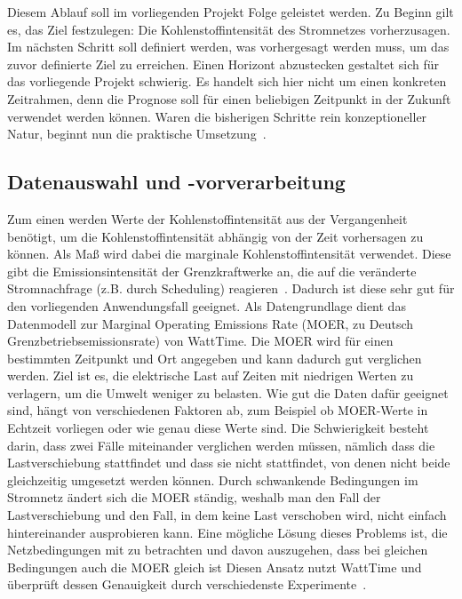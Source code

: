 Diesem Ablauf soll im vorliegenden Projekt Folge geleistet werden.
Zu Beginn gilt es, das Ziel festzulegen: Die Kohlenstoffintensität des Stromnetzes vorherzusagen.
Im nächsten Schritt soll definiert werden, was vorhergesagt werden muss, um das zuvor definierte Ziel zu erreichen.
Einen Horizont abzustecken gestaltet sich für das vorliegende Projekt schwierig.
Es handelt sich hier nicht um einen konkreten Zeitrahmen, denn die Prognose soll für einen beliebigen Zeitpunkt in der Zukunft verwendet werden können.
Waren die bisherigen Schritte rein konzeptioneller Natur, beginnt nun die praktische Umsetzung~\cite{Peixeiro.2022}.


\subsection{Datenauswahl und -vorverarbeitung}
Zum einen werden Werte der Kohlenstoffintensität aus der Vergangenheit benötigt, um die Kohlenstoffintensität abhängig von der Zeit vorhersagen zu können.
Als Maß wird dabei die marginale Kohlenstoffintensität verwendet.
Diese gibt die Emissionsintensität der Grenzkraftwerke an, die auf die veränderte Stromnachfrage (z.B. durch Scheduling) reagieren~\cite{Buchanan.2023}.
Dadurch ist diese sehr gut für den vorliegenden Anwendungsfall geeignet.
Als Datengrundlage dient das Datenmodell zur Marginal Operating Emissions Rate (MOER, zu Deutsch Grenzbetriebsemissionsrate) von WattTime.
Die MOER wird für einen bestimmten Zeitpunkt und Ort angegeben und kann dadurch gut verglichen werden.
Ziel ist es, die elektrische Last auf Zeiten mit niedrigen Werten zu verlagern, um die Umwelt weniger zu belasten.
Wie gut die Daten dafür geeignet sind, hängt von verschiedenen Faktoren ab, zum Beispiel ob MOER-Werte in Echtzeit vorliegen oder wie genau diese Werte sind.
Die Schwierigkeit besteht darin, dass zwei Fälle miteinander verglichen werden müssen, nämlich dass die Lastverschiebung stattfindet und dass sie nicht stattfindet, von denen nicht beide gleichzeitig umgesetzt werden können.
Durch schwankende Bedingungen im Stromnetz ändert sich die MOER ständig, weshalb man den Fall der Lastverschiebung und den Fall, in dem keine Last verschoben wird, nicht einfach hintereinander ausprobieren kann.
Eine mögliche Lösung dieses Problems ist, die Netzbedingungen mit zu betrachten und davon auszugehen, dass bei gleichen Bedingungen auch die MOER gleich ist
Diesen Ansatz nutzt WattTime und überprüft dessen Genauigkeit durch verschiedenste Experimente~\cite{WattTime.2022}.

